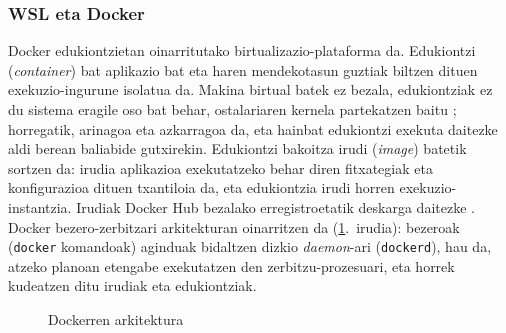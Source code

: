 \documentclass[10pt]{article}
\begin{document}
\subsubsection{WSL eta Docker}
\label{sec:docker}

Docker edukiontzietan oinarritutako birtualizazio-plataforma da. Edukiontzi (\textit{container}) bat aplikazio bat eta haren mendekotasun guztiak biltzen dituen exekuzio-ingurune isolatua da. Makina birtual batek ez bezala, edukiontziak ez du sistema eragile oso bat behar, ostalariaren kernela partekatzen baitu \cite{merkel2014docker}; horregatik, arinagoa eta azkarragoa da, eta hainbat edukiontzi exekuta daitezke aldi berean baliabide gutxirekin. Edukiontzi bakoitza irudi (\textit{image}) batetik sortzen da: irudia aplikazioa exekutatzeko behar diren fitxategiak eta konfigurazioa dituen txantiloia da, eta edukiontzia irudi horren exekuzio-instantzia. Irudiak Docker Hub bezalako erregistroetatik deskarga daitezke \cite{turnbull2014docker}.\\

Docker bezero-zerbitzari arkitekturan oinarritzen da (\ref{fig:docker_architecture}.~irudia): bezeroak (\texttt{docker} komandoak) aginduak bidaltzen dizkio \textit{daemon}-ari (\texttt{dockerd}), hau da, atzeko planoan etengabe exekutatzen den zerbitzu-prozesuari, eta horrek kudeatzen ditu irudiak eta edukiontziak.

\begin{figure}[!htbp]
\centering
{}
\caption{Dockerren arkitektura}
\label{fig:docker_architecture}
\end{figure}
\end{document}
